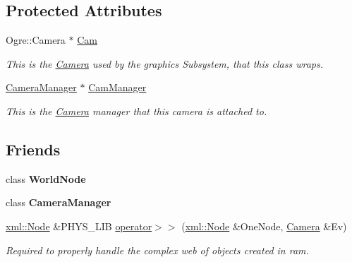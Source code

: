 \subsection*{Protected Attributes}
\begin{DoxyCompactItemize}
\item 
Ogre::Camera $\ast$ \hyperlink{classphys_1_1Camera_a91622148b9b9a9ae1554c828f7e2fc89}{Cam}
\begin{DoxyCompactList}\small\item\em This is the \hyperlink{classphys_1_1Camera}{Camera} used by the graphics Subsystem, that this class wraps. \item\end{DoxyCompactList}\item 
\hyperlink{classphys_1_1CameraManager}{CameraManager} $\ast$ \hyperlink{classphys_1_1Camera_a909203ede748deb1b587a8758ba8cec4}{CamManager}
\begin{DoxyCompactList}\small\item\em This is the \hyperlink{classphys_1_1Camera}{Camera} manager that this camera is attached to. \item\end{DoxyCompactList}\end{DoxyCompactItemize}
\subsection*{Friends}
\begin{DoxyCompactItemize}
\item 
\hypertarget{classphys_1_1Camera_a1cacd07efb11226da49a7c80569b18e8}{
class {\bfseries WorldNode}}
\label{d9/df8/classphys_1_1Camera_a1cacd07efb11226da49a7c80569b18e8}

\item 
\hypertarget{classphys_1_1Camera_afae5bf9a900e8c5bc70c9332785e8465}{
class {\bfseries CameraManager}}
\label{d9/df8/classphys_1_1Camera_afae5bf9a900e8c5bc70c9332785e8465}

\item 
\hyperlink{classphys_1_1xml_1_1Node}{xml::Node} \&PHYS\_\-LIB \hyperlink{classphys_1_1Camera_a903516ddc793b1d17d4d766a13bd6962}{operator$>$$>$} (\hyperlink{classphys_1_1xml_1_1Node}{xml::Node} \&OneNode, \hyperlink{classphys_1_1Camera}{Camera} \&Ev)
\begin{DoxyCompactList}\small\item\em Required to properly handle the complex web of objects created in ram. \item\end{DoxyCompactList}\end{DoxyCompactItemize}


